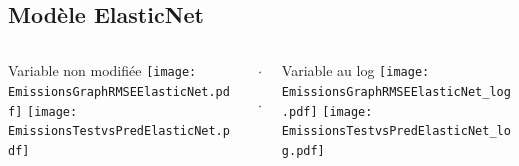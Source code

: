 \documentclass[8pt,aspectratio=169,hyperref={unicode=true}]{beamer}
\begin{document}
\subsection{Modèle ElasticNet}
\begin{frame}{\insertsubsection}
  \begin{columns}[t]
    \begin{column}{.33\textwidth}
      \centering Variable non modifiée
      \texttt{[image: EmissionsGraphRMSEElasticNet.pdf]}
      \texttt{[image: EmissionsTestvsPredElasticNet.pdf]}
    \end{column}
    \begin{column}{.33\textwidth}
      $\Longleftarrow$
      \scriptsize
      {\centering
        }
      

      \normalsize
      $\Longleftarrow$

      \raggedleft{$\Longrightarrow$}
      \scriptsize
      {\centering
        }
      

      \normalsize
      \raggedleft{$\Longrightarrow$}
    \end{column}
    \begin{column}{.33\textwidth}
      \centering Variable au log
      \texttt{[image: EmissionsGraphRMSEElasticNet\_log.pdf]}
      \texttt{[image: EmissionsTestvsPredElasticNet\_log.pdf]}
    \end{column}
  \end{columns}
\end{frame}
\end{document}
